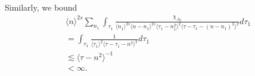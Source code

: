 \documentclass[12pt,reqno]{amsart}
\numberwithin{equation}{section}  %
\begin{document}
%
%
Similarly, we bound
%
%
\begin{equation}
\begin{split}
  & \langle n
    \rangle ^{2s}
    \sum_{n_{1}} \int_{\tau_{1}} \frac{\chi_{A_{2}}}{\langle n_{1} \rangle ^{2s} \langle n-n_{1} \rangle ^{2s} 
    \langle \tau_{1} - n_{1}^{2} \rangle^{2} \langle  \tau - \tau_{1} -
    (n - n_{1})^{2} \rangle^{2}}
    d \tau_1 
    \\
  & = 
  \int_{\tau_{1}} \frac{1}{\langle \tau_{1} \rangle^{2}  \langle \tau -
  \tau_{1} - n^{2} \rangle^{2}}
d \tau_1 
\\
  & \lesssim   \langle \tau - n^{2} \rangle ^{-1} 
  \\
  & < \infty.
	\end{split}
\end{equation}
%
\end{document}
